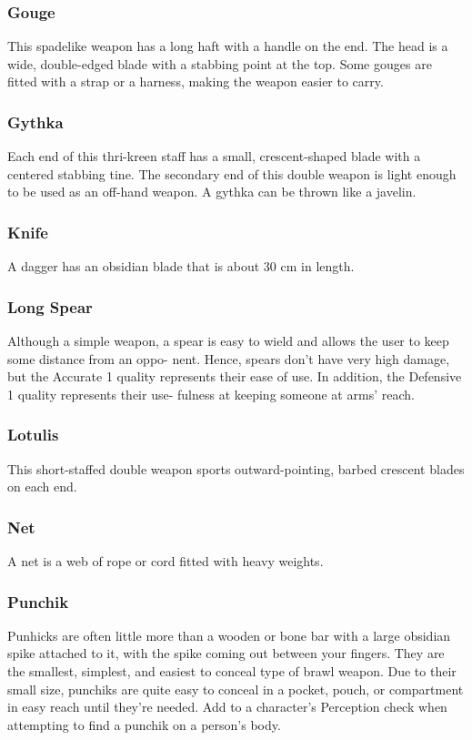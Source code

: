 \begin{multicols}{2}
\subsubsection{Gouge}
\label{itmmlee:gouge}
This spadelike weapon has a long haft with a handle on the end. The head
is a wide, double-edged blade with a stabbing point at the top. Some
gouges are fitted with a strap or a harness, making the weapon easier
to carry.

\subsubsection{Gythka}
\label{itmmlee:gythka}
Each end of this thri-kreen staff has a
small, crescent-shaped blade with a centered stabbing
tine. The secondary end of this double weapon is light
enough to be used as an off-hand weapon. A gythka
can be thrown like a javelin.

\subsubsection{Knife}
\label{itmmlee:knife}
A dagger has an obsidian blade that is about 30 cm in length.

\subsubsection{Long Spear}
\label{itmmlee:longspear}
Although a simple weapon, a spear is easy to wield and
allows the user to keep some distance from an oppo-
nent. Hence, spears don’t have very high damage, but
the Accurate 1 quality represents their ease of use. In
addition, the Defensive 1 quality represents their use-
fulness at keeping someone at arms’ reach.

\subsubsection{Lotulis}
\label{itmmlee:lotulis}
This short-staffed double weapon sports outward-pointing,
barbed crescent blades on each end.

\subsubsection{Net}
\label{itmmlee:net}
A net is a web of rope or cord fitted with heavy weights.

\subsubsection{Punchik}
\label{itmmlee:punchik}
Punhicks are often little more than a wooden or bone
bar with a large obsidian spike attached to it, with the spike
coming out between your fingers. They are the smallest, simplest,
and easiest to conceal type of brawl weapon. Due to their
small size, punchiks are quite easy to conceal in a pocket,
pouch, or compartment in easy reach until they're needed. Add
\setback to a character's Perception check when attempting to
find a punchik on a person's body.


\end{multicols}
